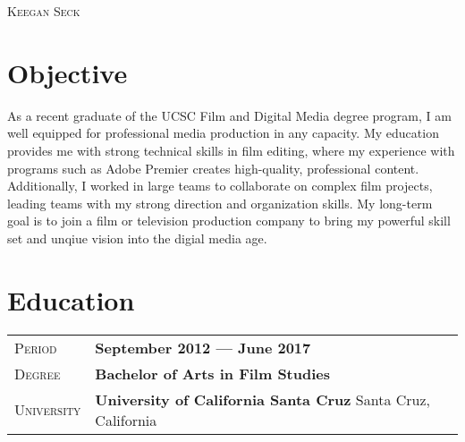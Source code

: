 \documentclass[a4paper, oneside, final]{scrartcl} %
\newcommand{\gray}{\rowcolor[gray]{.90}} %
\begin{document}
\begin{center} %


{\fontsize{20}{16}\selectfont\scshape Keegan Seck}\\ %


\section{Objective}
As a recent graduate of the UCSC Film and Digital Media degree program, I am well equipped for professional media production in any capacity. My education provides me with strong technical skills in film editing, where my experience with programs such as Adobe Premier creates high-quality, professional content. Additionally, I worked in large teams to collaborate on complex film projects, leading teams with my strong direction and organization skills. My long-term goal is to join a film or television production company to bring my powerful skill set and unqiue vision into the digial media age.


\section{Education}


\begin{tabularx}{0.97\linewidth}{>{\raggedleft\scshape}p{2cm}X}
\gray Period & \textbf{September 2012 --- June 2017}\\
\gray Degree & \textbf{Bachelor of Arts in Film Studies}\\
\gray University & \textbf{University of California Santa Cruz} \hfill Santa Cruz, California\\
\end{tabularx}


\end{center}
\end{document}
